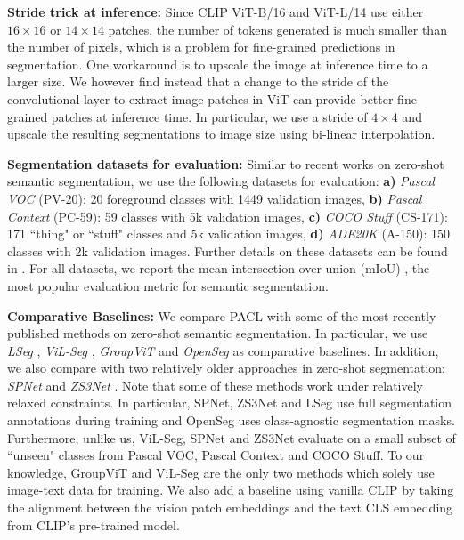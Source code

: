 \documentclass[10pt,twocolumn,letterpaper]{article}
\begin{document}
\textbf{Stride trick at inference:} Since CLIP ViT-B/16 and ViT-L/14 use either $16 \times 16$ or $14 \times 14$ patches, the number of tokens generated is much smaller than the number of pixels, which is a problem for fine-grained predictions in segmentation. One workaround is to upscale the image at inference time to a larger size. We however find instead that a change to the stride of the convolutional layer to extract image patches in ViT can provide better fine-grained patches at inference time. In particular, we use a stride of $4 \times 4$ and upscale the resulting segmentations to image size using bi-linear interpolation.





\textbf{Segmentation datasets for evaluation: } Similar to recent works \cite{xu2022groupvit, ghiasi2021open} on zero-shot semantic segmentation, we use the following datasets for evaluation: \textbf{a)} \emph{Pascal VOC} \cite{Everingham10} (PV-20): 20 foreground classes with 1449 validation images, \textbf{b)} \emph{Pascal Context} \cite{mottaghi_cvpr14} (PC-59): 59 classes with 5k validation images, \textbf{c)} \emph{COCO Stuff} \cite{caesar2018coco} (CS-171): 171 ``thing" or ``stuff" classes and 5k validation images, \textbf{d)} \emph{ADE20K} \cite{zhou2017scene} (A-150): 150 classes with 2k validation images. Further details on these datasets can be found in . For all datasets, we report the mean intersection over union (mIoU) \cite{Everingham10}, the most popular evaluation metric for semantic segmentation.

\textbf{Comparative Baselines:} We compare PACL with some of the most recently published methods on zero-shot semantic segmentation. In particular, we use \emph{LSeg} \cite{li2022language}, \emph{ViL-Seg} \cite{liu2022open}, \emph{GroupViT} \cite{xu2022groupvit} and \emph{OpenSeg} \cite{ghiasi2021open} as comparative baselines. In addition, we also compare with two relatively older approaches in zero-shot segmentation: \emph{SPNet} \cite{xian2019semantic} and \emph{ZS3Net} \cite{bucher2019zero}. Note that some of these methods work under relatively relaxed constraints. In particular, SPNet, ZS3Net and LSeg use full segmentation annotations during training and OpenSeg uses class-agnostic segmentation masks. Furthermore, unlike us, ViL-Seg, SPNet and ZS3Net evaluate on a small subset of ``unseen" classes from Pascal VOC, Pascal Context and COCO Stuff. To our knowledge, GroupViT and ViL-Seg are the only two methods which solely use image-text data for training. We also add a baseline using vanilla CLIP by taking the alignment between the vision patch embeddings and the text CLS embedding from CLIP's pre-trained model.
\end{document}
